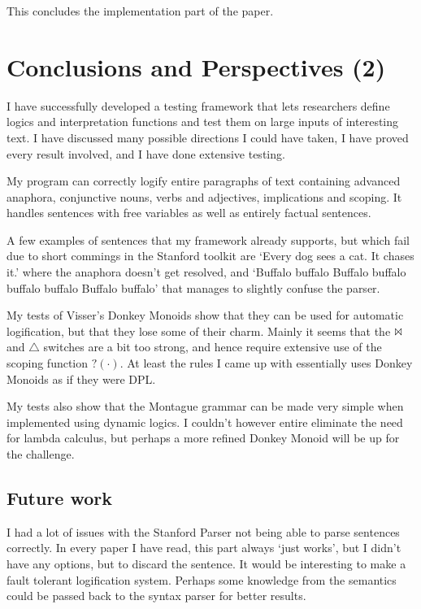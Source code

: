 \documentclass[12pt]{article}
\let\stdsection\section
\renewcommand\section{\newpage\stdsection}
\begin{document}
This concludes the implementation part of the paper.

\section{Conclusions and Perspectives (2)}

I have successfully developed a testing framework that lets researchers define logics and interpretation functions and test them on large inputs of interesting text. I have discussed many possible directions I could have taken, I have proved every result involved, and I have done extensive testing.

My program can correctly logify entire paragraphs of text containing advanced anaphora, conjunctive nouns, verbs and adjectives, implications and scoping. It handles sentences with free variables as well as entirely factual sentences.

A few examples of sentences that my framework already supports, but which fail due to short commings in the Stanford toolkit are `Every dog sees a cat. It chases it.' where the anaphora doesn't get resolved, and `Buffalo buffalo Buffalo buffalo buffalo buffalo Buffalo buffalo' that manages to slightly confuse the parser.

My tests of Visser's Donkey Monoids show that they can be used for automatic logification, but that they lose some of their charm. Mainly it seems that the $\Bowtie$ and $\triangle$ switches are a bit too strong, and hence require extensive use of the scoping function $?(\cdot)$. At least the rules I came up with essentially uses Donkey Monoids as if they were DPL.

My tests also show that the Montague grammar can be made very simple when implemented using dynamic logics. I couldn't however entire eliminate the need for lambda calculus, but perhaps a more refined Donkey Monoid will be up for the challenge.

\subsection{Future work}

I had a lot of issues with the Stanford Parser not being able to parse sentences correctly. In every paper I have read, this part always `just works', but I didn't have any options, but to discard the sentence. It would be interesting to make a fault tolerant logification system. Perhaps some knowledge from the semantics could be passed back to the syntax parser for better results.
\end{document}
